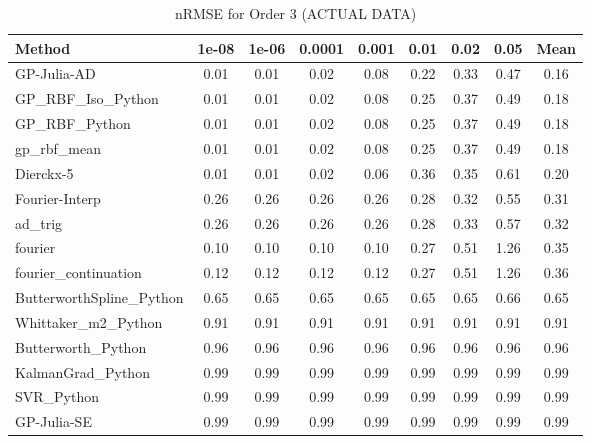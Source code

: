 \begin{table}[htbp]
\centering
\caption{nRMSE for Order 3 (ACTUAL DATA)}
\label{tab:order_3}
\tiny
\begin{tabular}{lcccccccc}
\toprule
\textbf{Method} & \textbf{1e-08} & \textbf{1e-06} & \textbf{0.0001} & \textbf{0.001} & \textbf{0.01} & \textbf{0.02} & \textbf{0.05} & \textbf{Mean} \\
\midrule
GP-Julia-AD & 0.01 & 0.01 & 0.02 & 0.08 & 0.22 & 0.33 & 0.47 & 0.16 \\
GP_RBF_Iso_Python & 0.01 & 0.01 & 0.02 & 0.08 & 0.25 & 0.37 & 0.49 & 0.18 \\
GP_RBF_Python & 0.01 & 0.01 & 0.02 & 0.08 & 0.25 & 0.37 & 0.49 & 0.18 \\
gp_rbf_mean & 0.01 & 0.01 & 0.02 & 0.08 & 0.25 & 0.37 & 0.49 & 0.18 \\
Dierckx-5 & 0.01 & 0.01 & 0.02 & 0.06 & 0.36 & 0.35 & 0.61 & 0.20 \\
Fourier-Interp & 0.26 & 0.26 & 0.26 & 0.26 & 0.28 & 0.32 & 0.55 & 0.31 \\
ad_trig & 0.26 & 0.26 & 0.26 & 0.26 & 0.28 & 0.33 & 0.57 & 0.32 \\
fourier & 0.10 & 0.10 & 0.10 & 0.10 & 0.27 & 0.51 & 1.26 & 0.35 \\
fourier_continuation & 0.12 & 0.12 & 0.12 & 0.12 & 0.27 & 0.51 & 1.26 & 0.36 \\
ButterworthSpline_Python & 0.65 & 0.65 & 0.65 & 0.65 & 0.65 & 0.65 & 0.66 & 0.65 \\
Whittaker_m2_Python & 0.91 & 0.91 & 0.91 & 0.91 & 0.91 & 0.91 & 0.91 & 0.91 \\
Butterworth_Python & 0.96 & 0.96 & 0.96 & 0.96 & 0.96 & 0.96 & 0.96 & 0.96 \\
KalmanGrad_Python & 0.99 & 0.99 & 0.99 & 0.99 & 0.99 & 0.99 & 0.99 & 0.99 \\
SVR_Python & 0.99 & 0.99 & 0.99 & 0.99 & 0.99 & 0.99 & 0.99 & 0.99 \\
GP-Julia-SE & 0.99 & 0.99 & 0.99 & 0.99 & 0.99 & 0.99 & 0.99 & 0.99 \\
\bottomrule
\end{tabular}
\end{table}
